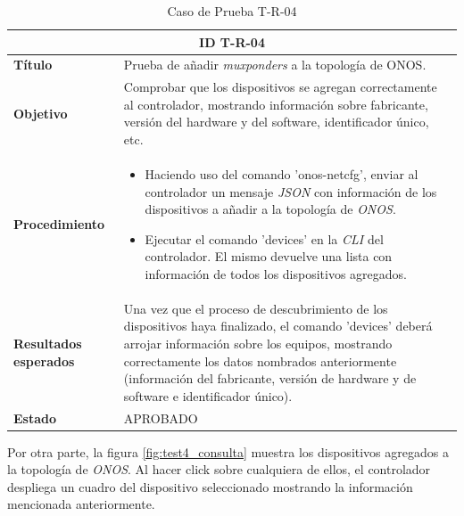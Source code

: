 \begin{table}[H]
  \centering
  \begin{tabular}{ |m{2.5cm}|m{11cm}|  }
  \hline
  \multicolumn{2}{|c|}{ \textbf{ID T-R-04} } \\
  \hline
  \centering
  \textbf{Título} & Prueba de añadir \textit{muxponders} a la topología de ONOS.  \\
  \hline
  \centering
  \textbf{Objetivo} & Comprobar que los dispositivos se agregan correctamente al controlador, mostrando información sobre fabricante, versión del hardware y del software, identificador único, etc.  \\
  \hline
  \centering
  \textbf{Procedimiento} & \begin{itemize}
    \item Haciendo uso del comando 'onos-netcfg', enviar al controlador un mensaje \textit{JSON} con información de los dispositivos a añadir a la topología de \textit{ONOS}.
    \item Ejecutar el comando 'devices' en la \textit{CLI} del controlador. El mismo devuelve una lista con información de todos los dispositivos agregados.
  \end{itemize}     \\
  \hline
  \centering
  \textbf{Resultados esperados} & 
  Una vez que el proceso de descubrimiento de los dispositivos haya finalizado, el comando 'devices' deberá arrojar información sobre los equipos, mostrando correctamente los datos nombrados anteriormente (información del fabricante, versión de hardware y de software e identificador único).
    \\
  
    \hline
  \centering
    \textbf{Estado}    & APROBADO  \\
  \hline
  \end{tabular}
  
  \caption{Caso de Prueba T-R-04}
  \label{tab:TR04}
  \end{table}

  Por otra parte, la figura \ref{fig:test4_consulta} muestra los dispositivos agregados a la topología de \textit{ONOS}. Al hacer click sobre cualquiera de ellos, el controlador despliega un cuadro del dispositivo seleccionado mostrando la información mencionada anteriormente.

